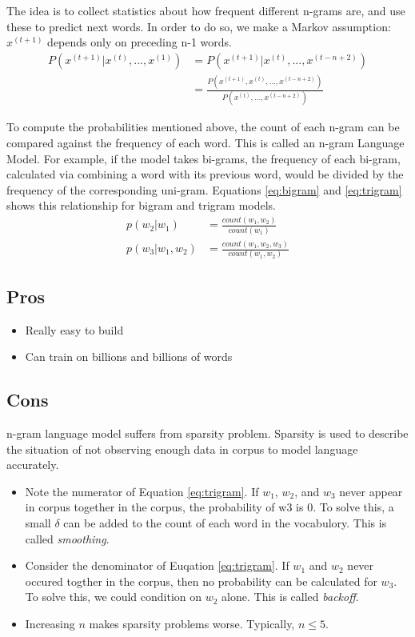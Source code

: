 \documentclass[letterpaper]{article}
\begin{document}
The idea is to collect statistics about how frequent different n-grams are,
and use these to predict next words. In order to do so, we make a Markov
assumption: $x^{(t+1)}$ depends only on preceding n-1 words.
\begin{align}
	P(x^{(t+1)}|x^{(t)},...,x^{(1)}) &= P(x^{(t+1)}|x^{(t)},...,x^{(t-n+2)}) \label{eq:assumption} \\
	&= \frac{P(x^{(t+1)},x^{(t)},...,x^{(t-n+2)})}{P(x^{(t)},...,x^{(t-n+2)})} \label{eq:condprob}
\end{align}

To compute the probabilities mentioned above, the count of each
n-gram can be compared against the frequency of each word.
This is called an n-gram Language Model. For example, if the model
takes bi-grams, the frequency of each bi-gram, calculated via combining
a word with its previous word, would be divided by the frequency of
the corresponding uni-gram. Equations \ref{eq:bigram} and \ref{eq:trigram}
shows this relationship for bigram and trigram models.
\begin{align}
	p(w_2|w_1) &= \frac{count(w_1,w_2)}{count(w_1)} \label{eq:bigram} \\
	p(w_3|w_1,w_2) &= \frac{count(w_1,w_2,w_3)}{count(w_1,w_2)} \label{eq:trigram}
\end{align}

\subsection{Pros}
\begin{itemize}
	\item Really easy to build
	\item Can train on billions and billions of words
\end{itemize}

\subsection{Cons}
n-gram language model suffers from sparsity problem. Sparsity is used
to describe the situation of not observing enough data in corpus to
model language accurately. 

\begin{itemize}
	\item Note the numerator of Equation \ref{eq:trigram}. If $w_1$, $w_2$,
	and $w_3$ never appear in corpus together in the corpus, the probability of 
	w3 is 0. To solve this, a small $\delta$ can be added to the count of each 
	word in the vocabulory. This is called \textit{smoothing}.
	\item Consider the denominator of Euqation \ref{eq:trigram}. 
	If $w_1$ and $w_2$ never occured togther in the corpus, then 
	no probability can be calculated for $w_3$.
	To solve this, we could condition on $w_2$ alone. This is called
	\textit{backoff}.
	\item Increasing $n$ makes sparsity problems worse. Typically, $n \leq 5$.
\end{itemize}
\end{document}

